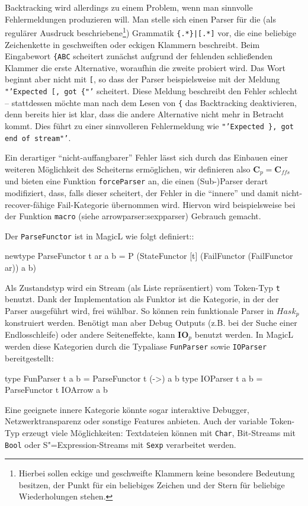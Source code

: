 \documentclass[12pt, a4paper, bibgerm]{scrbook}
\newenvironment{DIFnomarkup}{}{}
\newcommand\icode[1]{\lstinline?#1?}
\newcommand\sref{}
\newcommand{\sees}[1]{(siehe \sref{#1})}
\newcommand{\sexp}{S"=Expression}
\begin{document}
Backtracking wird allerdings zu einem Problem, wenn man sinnvolle
Fehlermeldungen produzieren will. Man stelle sich einen Parser für die
(als regulärer Ausdruck beschriebene\footnote{Hierbei sollen eckige und
  geschweifte Klammern keine besondere Bedeutung besitzen, der Punkt für
  ein beliebiges Zeichen und der Stern für beliebige Wiederholungen
  stehen.}) Grammatik \texttt{\{.*\}|[.*]} vor, die eine beliebige
Zeichenkette in geschweiften oder eckigen Klammern beschreibt. Beim
Eingabewort \texttt{\{ABC} scheitert zunächst aufgrund der fehlenden
schließenden Klammer die erste Alternative, woraufhin die zweite
probiert wird. Das Wort beginnt aber nicht mit \texttt{[}, so dass der
  Parser beispielsweise mit der Meldung \texttt{"'Expected [, got \{"'}
    scheitert. Diese Meldung beschreibt den Fehler schlecht --
    stattdessen möchte man nach dem Lesen von \texttt{\{} das
    Backtracking deaktivieren, denn bereits hier ist klar, dass die
    andere Alternative nicht mehr in Betracht kommt. Dies führt zu einer
    sinnvolleren Fehlermeldung wie \texttt{"'Expected \}, got end of
      stream"'}.

Ein derartiger "`nicht-auffangbarer"' Fehler lässt sich durch das
Einbauen einer weiteren Möglichkeit des Scheiterns ermöglichen, wir
definieren also $\mathbf{C}_p = \mathbf{C}_{ffs}$ und bieten eine
Funktion \icode{forceParser} an, die einen (Sub-)Parser derart
modifiziert, dass, falls dieser scheitert, der Fehler in die "`innere"'
und damit nicht-recover-fähige Fail-Kategorie übernommen wird. Hiervon
wird beispielsweise bei der Funktion \icode{macro}
\sees{arrowparser:sexpparser} Gebrauch gemacht.

Der \icode{ParseFunctor} ist in MagicL wie folgt definiert::
\begin{DIFnomarkup}\begin{code}
newtype ParseFunctor t ar a b =
  P (StateFunctor
     [t]
     (FailFunctor (FailFunctor ar))
     a
     b)
\end{code}\end{DIFnomarkup}
Als Zustandstyp wird ein Stream (als Liste repräsentiert) vom Token-Typ
\icode{t} benutzt.  Dank der Implementation als Funktor ist die
Kategorie, in der der Parser ausgeführt wird, frei wählbar. So können
rein funktionale Parser in $Hask_p$ konstruiert werden. Benötigt man
aber Debug Outputs (z.B. bei der Suche einer Endlosschleife) oder andere
Seiteneffekte, kann $\mathbf{IO}_p$ benutzt werden. In MagicL werden
diese Kategorien durch die Typaliase \icode{FunParser} sowie
\icode{IOParser} bereitgestellt:
\begin{DIFnomarkup}\begin{code}
type FunParser t a b = ParseFunctor t (->) a b
type IOParser  t a b = ParseFunctor t IOArrow a b
\end{code}\end{DIFnomarkup}
Eine geeignete innere Kategorie könnte
sogar interaktive Debugger, Netzwerktransparenz oder sonstige Features
anbieten. Auch der variable Token-Typ erzeugt viele Möglichkeiten:
Textdateien können mit \icode{Char}, Bit-Streams mit \icode{Bool} oder
\sexp{}-Streams mit \icode{Sexp} verarbeitet werden.
\end{document}
